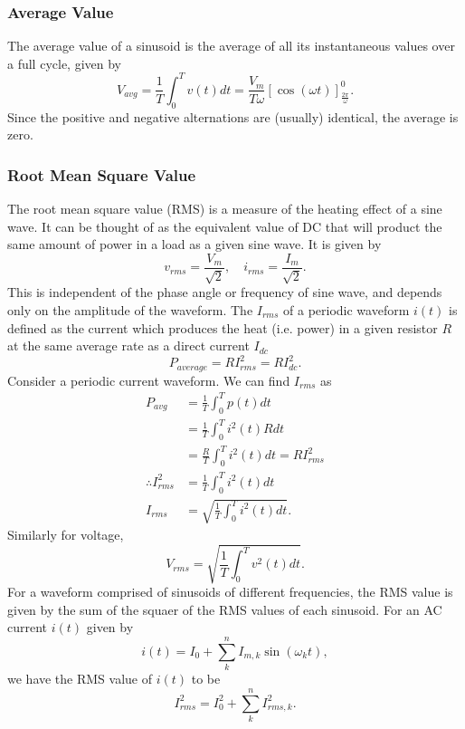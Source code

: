 \documentclass{article}
\begin{document}
\subsubsection{Average Value}
The average value of a sinusoid is the average of all its instantaneous values over a full cycle, given by 
\[
    V_{avg}=\frac{1}{T}\int_0^Tv(t)dt=\frac{V_m}{T\omega }\left[ \cos \left( \omega t \right) \right]_{\frac{2\pi }{\omega }}^0.
\]
Since the positive and negative alternations are (usually) identical, the average is zero.

\subsubsection{Root Mean Square Value}
The root mean square value (RMS) is a measure of the heating effect of a sine wave. It can be thought of as the equivalent value of DC that will product the same amount of power in a load as a given sine wave. It is given by 
\[
    v_{rms}=\frac{V_m}{\sqrt{2}},\quad i_{rms}=\frac{I_m}{\sqrt{2}}.
\]
This is independent of the phase angle or frequency of sine wave, and depends only on the amplitude of the waveform. The $I_{rms}$ of a periodic waveform $i(t)$ is defined as the current which produces the heat (i.e. power) in a given resistor $R$ at the same average rate as a direct current $I_{dc}$ 
\[
    P_{average}=RI_{rms}^2=RI_{dc}^2.
\]
Consider a periodic current waveform. We can find $I_{rms}$ as
\begin{align*}
    P_{avg} &= \frac{1}{T}\int_0^Tp(t)dt\\
            &= \frac{1}{T}\int_0^Ti^2(t)Rdt\\
            &= \frac{R}{T}\int_0^Ti^2(t)dt=RI^2_{rms}\\
    \therefore I^2_{rms}&=\frac{1}{T}\int_0^Ti^2(t)dt\\
    I_{rms}&= \sqrt{\frac{1}{T}\int_0^Ti^2(t)dt}.
\end{align*}
Similarly for voltage,
\[
    V_{rms}=\sqrt{\frac{1}{T}\int_0^Tv^2(t)dt}.
\]
For a waveform comprised of sinusoids of different frequencies, the RMS value is given by the sum of the squaer of the RMS values of each sinusoid. For an AC current $i(t)$ given by 
\[
    i(t)=I_0+\sum_{k}^{n} I_{m,k}\sin(\omega _kt),
\]
we have the RMS value of $i(t)$ to be 
\[
    I^2_{rms}=I_0^2+\sum_{k}^{n} I^2_{rms,k}.
\]
\end{document}
